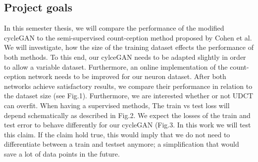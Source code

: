 \documentclass[10pt]{article}
\begin{document}
	\subsection*{Project goals}
		In this semester thesis, we will compare the performance of the modified cycleGAN to the semi-supervised count-ception method proposed by Cohen et al. We will investigate, how the size of the training dataset effects the performance of both methods. To this end, our cylceGAN needs to be adapted slightly in order to allow a variable dataset. Furthermore, an online implementation of the count-ception network needs to be improved for our neuron dataset. After both networks achieve satisfactory results, we compare their performance in relation to the dataset size (see Fig.1). Furthermore, we are interested whether or not UDCT can overfit. When having a supervised methods, The train vs test loss will depend schematically as described in Fig.2. We expect the losses of the train and test error to behave differently for our cycleGAN (Fig.3. In this work we will test this claim. If the claim hold true, this would imply that we do not need to differentiate between a train and testset anymore; a simplification that would save a lot of data points in the future.
		
		\newpage
		
\end{document}
